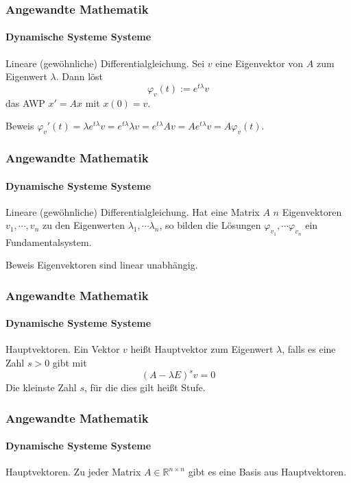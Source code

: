 \documentclass{beamer}
\begin{document}
\begin{frame}
    \frametitle{Angewandte Mathematik}
\framesubtitle{Dynamische Systeme Systeme}
\begin{block}{Lineare (gewöhnliche) Differentialgleichung.}
Sei $v$ eine Eigenvektor von $A$ zum Eigenwert $\lambda$. Dann löst 
$$ \varphi_v(t) := e^{t \lambda} v$$ das AWP $x' = Ax$ mit $x(0) = v$.

\end{block}
\begin{block}{Beweis}
$\varphi_v'(t) =  \lambda  e^{t \lambda}  v =  e^{t\lambda}  \lambda v =  e^{t\lambda}  A v  = A e^{t\lambda}   v  = A  \varphi_v(t)$.

\end{block}
 \end{frame}

\begin{frame}
    \frametitle{Angewandte Mathematik}
\framesubtitle{Dynamische Systeme Systeme}
\begin{block}{Lineare (gewöhnliche) Differentialgleichung.}
Hat eine Matrix $A$ $n$ Eigenvektoren $v_1, \cdots , v_n$ zu den Eigenwerten $\lambda_1, \cdots  \lambda_n$, 
so bilden die Lösungen $ \varphi_{v_1}, \cdots  \varphi_{v_n}$ ein Fundamentalsystem.
\end{block}
\begin{block}{Beweis}
Eigenvektoren sind linear unabhängig.
\end{block}
 \end{frame}


\begin{frame}
    \frametitle{Angewandte Mathematik}
\framesubtitle{Dynamische Systeme Systeme}
\begin{block}{Hauptvektoren.}
Ein Vektor $v$ heißt Hauptvektor zum Eigenwert $\lambda$, falls es eine Zahl $s>0$ gibt mit 
$$ (A - \lambda E)^s v = 0$$
Die kleinste Zahl $s$, für die dies gilt heißt Stufe.
\end{block}

 \end{frame}


\begin{frame}
    \frametitle{Angewandte Mathematik}
\framesubtitle{Dynamische Systeme Systeme}
\begin{block}{Hauptvektoren.}
Zu jeder Matrix $A \in \mathbb{R}^{n \times n}$ gibt es eine Basis aus Hauptvektoren. 

\end{block}

 \end{frame}
\end{document}
